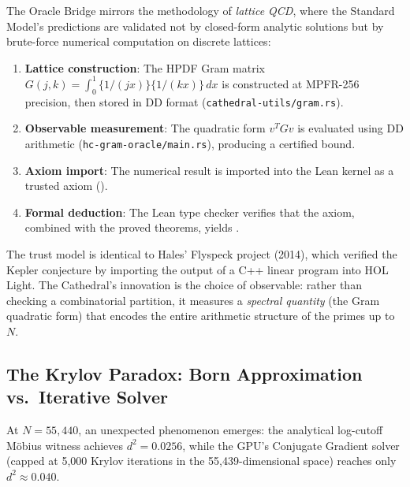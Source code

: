 \begin{principle}
\label{princ:lattice-qcd}
The Oracle Bridge mirrors the methodology of \emph{lattice QCD}, where
the Standard Model's predictions are validated not by closed-form
analytic solutions but by brute-force numerical computation on discrete
lattices:

\begin{enumerate}
  \item \textbf{Lattice construction}: The HPDF Gram matrix
    $G(j,k) = \int_0^1 \{1/(jx)\}\{1/(kx)\}\,dx$ is constructed
    at MPFR-256 precision, then stored in DD format
    (\texttt{cathedral-utils/gram.rs}).
  \item \textbf{Observable measurement}: The quadratic form
    $v^T G v$ is evaluated using DD arithmetic
    (\texttt{hc-gram-oracle/main.rs}), producing a certified bound.
  \item \textbf{Axiom import}: The numerical result is imported into
    the Lean kernel as a trusted axiom ().
  \item \textbf{Formal deduction}: The Lean type checker verifies
    that the axiom, combined with the proved theorems, yields
    .
\end{enumerate}

The trust model is identical to Hales' Flyspeck project (2014), which
verified the Kepler conjecture by importing the output of a C++ linear
program into HOL Light. The Cathedral's innovation is the choice of
observable: rather than checking a combinatorial partition, it measures
a \emph{spectral quantity} (the Gram quadratic form) that encodes the
entire arithmetic structure of the primes up to~$N$.
\end{principle}

\subsection{The Krylov Paradox: Born Approximation vs.\ Iterative Solver}

At $N = 55{,}440$, an unexpected phenomenon emerges: the analytical
log-cutoff Möbius witness achieves $d^2 = 0.0256$, while the GPU's
Conjugate Gradient solver (capped at 5{,}000 Krylov iterations in the
55{,}439-dimensional space) reaches only $d^2 \approx 0.040$.

